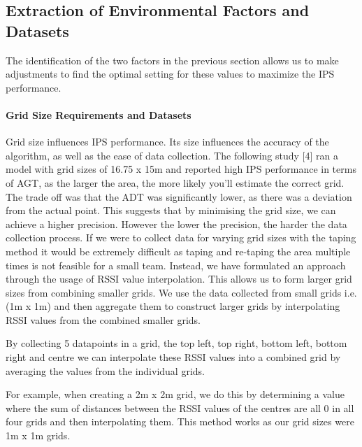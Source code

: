 \documentclass[conference]{IEEEtran}
\begin{document}
	
	\subsection{Extraction of Environmental Factors and Datasets}
	The identification of the two factors in the previous section allows us to make adjustments to find the optimal setting for these values to maximize the IPS performance.
	
	\paragraph{Grid Size Requirements and Datasets} Grid size influences IPS performance. Its size influences the accuracy of the algorithm, as well as the ease of data collection. The following study [4] ran a model with grid sizes of 16.75 x 15m and reported high IPS performance in terms of AGT, as the larger the area, the more likely you’ll estimate the correct grid. The trade off was that the ADT was significantly lower, as there was a deviation from the actual point. This suggests that by minimising the grid size, we can achieve a higher precision. However the lower the precision, the harder the data collection process. 
	If we were to collect data for varying grid sizes with the taping method it would be extremely difficult as taping and re-taping the area multiple times is not feasible for a small team. Instead, we have formulated an approach through the usage of RSSI value interpolation. This allows us to form larger grid sizes from combining smaller grids. We use the data collected from small grids i.e. (1m x 1m) and then aggregate them to construct larger grids by interpolating RSSI values from the combined smaller grids.
	
	By collecting 5 datapoints in a grid, the top left, top right, bottom left, bottom right and centre we can interpolate these RSSI values into a combined grid by averaging the values from the individual grids.
	
	For example, when creating a 2m x 2m grid, we do this by determining a value where the sum of distances between the RSSI values of the centres are all 0 in all four grids and then interpolating them. This method works as our grid sizes were 1m x 1m grids.
	
\end{document}
